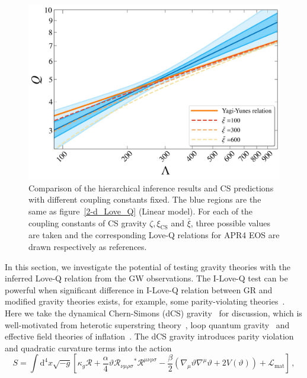 \documentclass[a4paper,11pt]{article}
\begin{document}
\begin{figure}[htbp]
\begin{minipage}{0.48\linewidth}
    \end{minipage}
    \vspace{3mm}
    \begin{minipage}{0.48\linewidth}
        \includegraphics[width=\linewidth]{CS_xi_bar_APR4_2d.pdf}
    \end{minipage}
    \caption{Comparison of the hierarchical inference results and CS predictions 
    with different coupling constants fixed. The blue regions are the same as 
    figure~\ref{2-d_Love_Q} (Linear model). For each of the coupling constants of 
    CS gravity $\zeta, \xi_{\mathrm{CS}}$ and $\bar\xi$, three possible values are 
    taken and the corresponding Love-Q relations for APR4 EOS are drawn 
    respectively as references.}
    \label{cs_Love_Q}
\end{figure}
In this section, we investigate the potential of testing gravity theories with the 
inferred Love-Q relation from the GW observations. The I-Love-Q test can be 
powerful when significant difference in I-Love-Q relation between GR and modified 
gravity theories exists, for example, some parity-violating theories~\cite{Yagi_2017, Yunes:2025xwp}. 
Here we take the dynamical Chern-Simons (dCS) gravity~\cite{Jackiw:2003pm, Smith:2007jm,Alexander:2009tp} for discussion, 
which is well-motivated from heterotic superstring theory~\cite{Polchinski:1998rq,
Polchinski:1998rr}, loop quantum gravity~\cite{Alexander:2004xd,Taveras:2008yf,
Calcagni:2009xz} and effective field theories of inflation~\cite{Weinberg:2008hq}. 
The dCS gravity introduces parity violation and quadratic curvature terms into the action~\cite{Alexander:2009tp,Gupta:2017vsl}
\begin{equation}
   \label{cs_action}
   S = \int \mathrm{d}^4 x \sqrt{-g}\left[ \kappa_g \mathcal{R} + \frac{\alpha}{4} \mathcal{\vartheta} \mathcal{R}_{\nu\mu\rho\sigma} {}^{*}\mathcal{R}^{\mu\nu\rho\sigma} - \frac{\beta}{2}\left(\nabla_{\mu}\mathcal{\vartheta}\nabla^{\mu}\mathcal{\vartheta}+2V(\mathcal{\vartheta})\right) + \mathcal{L}_{\mathrm{mat}}\right]\,,
\end{equation}
\end{document}
